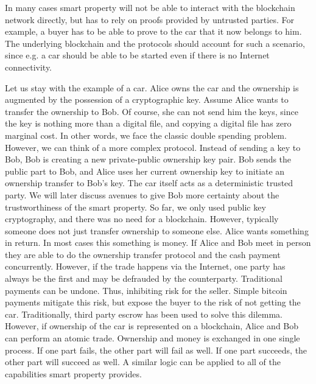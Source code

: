 In many cases smart property will not be able to interact with the blockchain network directly, but has to rely on proofs provided by untrusted parties. For example, a buyer has to be able to prove to the car that it now belongs to him. The underlying blockchain and the protocols should account for such a scenario, since e.g. a car should be able to be started even if there is no Internet connectivity.




Let us stay with the example of a car. Alice owns the car and the ownership is augmented by the possession of a cryptographic key. Assume Alice wants to transfer the ownership to Bob. Of course, she can not send him the keys, since the key is nothing more than a digital file, and copying a digital file has zero marginal cost. In other words, we face the classic double spending problem. However, we can think of a more complex protocol. Instead of sending a key to Bob, Bob is creating a new private-public ownership key pair. Bob sends the public part to Bob, and Alice uses her current ownership key to initiate an ownership transfer to Bob's key. The car itself acts as a deterministic trusted party. We will later discuss avenues to give Bob more certainty about the trustworthiness of the smart property.
So far, we only used public key cryptography, and there was no need for a blockchain. However, typically someone does not just transfer ownership to someone else. Alice wants something in return. In most cases this something is money. If Alice and Bob meet in person they are able to do the ownership transfer protocol and the cash payment concurrently. However, if the trade happens via the Internet, one party has always be the first and may be defrauded by the counterparty. Traditional payments can be undone. Thus, inhibiting risk for the seller. Simple bitcoin payments mitigate this risk, but expose the buyer to the risk of not getting the car. Traditionally, third party escrow has been used to solve this dilemma.
However, if ownership of the car is represented on a blockchain, Alice and Bob can perform an atomic trade. Ownership and money is exchanged in one single process. If one part fails, the other part will fail as well. If one part succeeds, the other part will succeed as well. A similar logic can be applied to all of the capabilities smart property provides.

